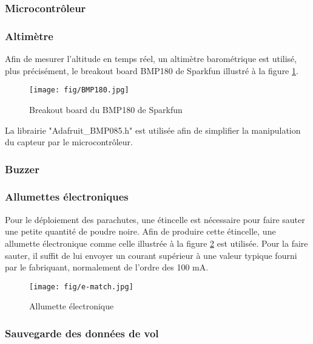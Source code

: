 \subsubsection{Microcontrôleur}



\subsubsection{Altimètre}

Afin de mesurer l'altitude en temps réel, un altimètre barométrique est
utilisé, plus précisément, le breakout board BMP180 de Sparkfun illustré à la
figure \ref{f:BMP180}.

\begin{figure}[H]
	\center
	\texttt{[image: fig/BMP180.jpg]}
	\caption{Breakout board du BMP180 de Sparkfun}
	\label{f:BMP180}
\end{figure}

La librairie "Adafruit\_BMP085.h" est utilisée afin de simplifier la
manipulation du capteur par le microcontrôleur.

\subsubsection{Buzzer}



\subsubsection{Allumettes électroniques}

Pour le déploiement des parachutes, une étincelle est nécessaire pour faire
sauter une petite quantité de poudre noire. Afin de produire cette étincelle,
une allumette électronique comme celle illustrée à la figure \ref{f:e-match} est
utilisée. Pour la faire sauter, il suffit de lui envoyer un courant supérieur
à une valeur typique fourni par le fabriquant, normalement de l'ordre des
100 mA.

\begin{figure}[H]
	\center
	\texttt{[image: fig/e-match.jpg]}
	\caption{Allumette électronique}
	\label{f:e-match}
\end{figure}

\subsubsection{Sauvegarde des données de vol}



